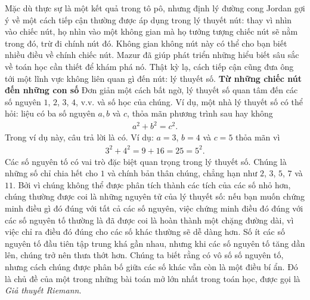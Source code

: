 \begin{multicols}{2}
	\vskip 0.05cm
	Mặc dù thực sự là một kết quả trong tô pô, nhưng định lý đường cong Jordan gợi ý về một cách tiếp cận thường được áp dụng trong lý thuyết nút: thay vì nhìn vào chiếc nút, họ nhìn vào một không gian mà họ tưởng tượng chiếc nút sẽ nằm trong đó, trừ đi chính nút đó. Không gian không nút này có thể cho bạn biết nhiều điều về chính chiếc nút. Mazur đã giúp phát triển những hiểu biết sâu sắc về toán học cần thiết để khám phá nó. Thật kỳ lạ, cách tiếp cận cũng đưa ông tới một lĩnh vực không liên quan gì đến nút: lý thuyết số.
	\vskip 0.05cm
	\textbf{\color{duongvaotoanhoc}Từ những chiếc nút đến những con số} 
	\vskip 0.05cm
	Đơn giản một cách bất ngờ, lý thuyết số quan tâm đến các số nguyên $1$, $2$, $3$, $4$, v.v. và số học của chúng. Ví dụ, một nhà lý thuyết số có thể hỏi: liệu có ba số nguyên $a, b$ và $c$, thỏa mãn phương trình sau hay không
	\setlength{\abovedisplayskip}{5pt}
	\setlength{\belowdisplayskip}{5pt}
	\begin{align*}
		a ^ 2 + b ^ 2 = c ^ 2. 
	\end{align*}
	Trong ví dụ này, câu trả lời là có. Ví dụ: $ a = 3 $, $ b = 4 $ và $ c = 5 $ thỏa mãn vì 
	\begin{align*}
		3 ^ 2 + 4 ^ 2 = 9 + 16 = 25 = 5 ^ 2.
	\end{align*}
	Các số nguyên tố có vai trò đặc biệt quan trọng trong lý thuyết số. Chúng là những số chỉ chia hết cho $1$ và chính bản thân chúng, chẳng hạn như $2$, $3$, $5$, $7$ và $11$. Bởi vì chúng không thể được phân tích thành các tích của các số nhỏ hơn, chúng thường được coi là những nguyên tử của lý thuyết số: nếu bạn muốn chứng minh điều gì đó đúng với tất cả các số nguyên, việc chứng minh điều đó đúng với các số nguyên tố thường là đã được coi là hoàn thành một chặng đường dài, vì việc chỉ ra điều đó đúng cho các số khác thường sẽ dễ dàng hơn.
	\vskip 0.05cm
	Số ít các số nguyên tố đầu tiên tập trung khá gần nhau, nhưng khi các số nguyên tố  tăng dần lên, chúng trở nên thưa thớt hơn. Chúng ta biết rằng có vô số số nguyên tố, nhưng cách chúng được phân bố giữa các số khác vẫn còn là một điều bí ẩn. Đó là chủ đề của một trong những bài toán mở lớn nhất trong toán học, được gọi là \textit{Giả thuyết Riemann}.
	\begin{figure}[H]
		\centering
		\vspace*{-5pt}
		\captionsetup{labelformat= empty, justification=centering}

\end{figure}
\end{multicols}
